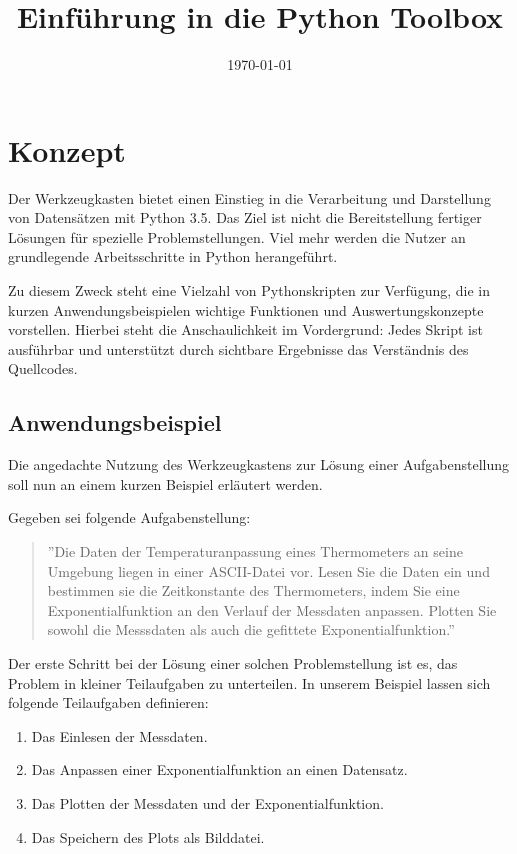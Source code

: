 \documentclass[a4paper,fleqn]{article}
\title{Einführung in die Python Toolbox}
\author{}
\date{\today}
\begin{document}
\maketitle

\section*{Konzept}
Der Werkzeugkasten bietet einen Einstieg in die Verarbeitung und Darstellung von
Datensätzen mit Python 3.5. Das Ziel ist nicht die Bereitstellung fertiger
Lösungen für spezielle Problemstellungen. Viel mehr werden die Nutzer an
grundlegende Arbeitsschritte in Python herangeführt.

Zu diesem Zweck steht eine Vielzahl von Pythonskripten zur Verfügung, die in
kurzen Anwendungsbeispielen wichtige Funktionen und Auswertungskonzepte
vorstellen. Hierbei steht die Anschaulichkeit im Vordergrund: Jedes Skript ist
ausführbar und unterstützt durch sichtbare Ergebnisse das Verständnis des
Quellcodes.

\subsection*{Anwendungsbeispiel}
Die angedachte Nutzung des Werkzeugkastens zur Lösung einer Aufgabenstellung
soll nun an einem kurzen Beispiel erläutert werden.

Gegeben sei folgende Aufgabenstellung:

\begin{quote}
''Die Daten der Temperaturanpassung eines Thermometers an seine Umgebung liegen
in einer ASCII-Datei vor. Lesen Sie die Daten ein und bestimmen sie die
Zeitkonstante des Thermometers, indem Sie eine Exponentialfunktion an den
Verlauf der Messdaten anpassen. Plotten Sie sowohl die Messsdaten als auch die
gefittete Exponentialfunktion.''
\end{quote}

Der erste Schritt bei der Lösung einer solchen Problemstellung ist es, das
Problem in kleiner Teilaufgaben zu unterteilen. In unserem Beispiel lassen sich
folgende Teilaufgaben definieren:

\begin{enumerate}
  \item Das Einlesen der Messdaten.
  \item Das Anpassen einer Exponentialfunktion an einen Datensatz.
  \item Das Plotten der Messdaten und der Exponentialfunktion.
  \item Das Speichern des Plots als Bilddatei.
\end{enumerate}
\end{document}
